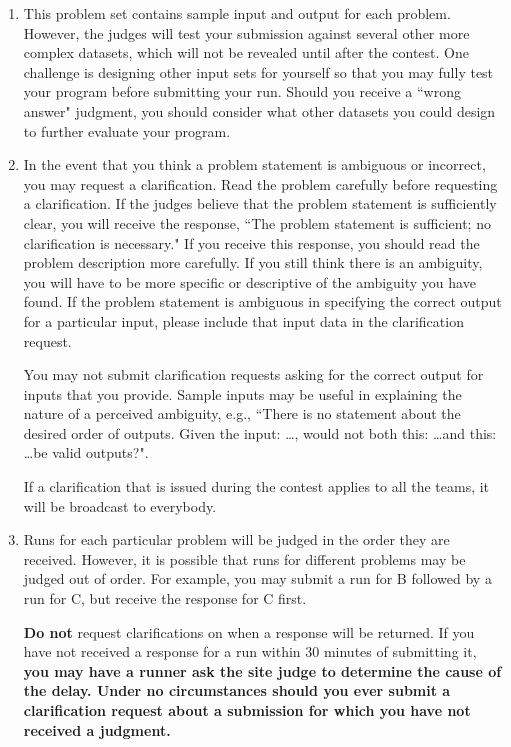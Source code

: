\begin{enumerate}
\item This problem set contains sample input and output for each
  problem. However, the judges will test your
  submission against several other more complex datasets, which will
  not be revealed until after the contest. One challenge is
  designing other input sets for yourself so that you may fully test
  your program before submitting your run. Should you receive a
  ``wrong answer" judgment, you should consider what other datasets you
  could design to further evaluate your program.

\item In the event that you think a problem statement is ambiguous or
  incorrect, you may request a clarification. Read the problem
  carefully before requesting a clarification. If the judges believe
  that the problem statement is sufficiently clear, you will receive
  the response, ``The problem statement is sufficient; no clarification
  is necessary." If you receive this response, you should read the
  problem description more carefully. If you still think there is an
  ambiguity, you will have to be more specific or descriptive of the
  ambiguity you have found. If the problem statement is ambiguous in
  specifying the correct output for a particular input, please include
  that input data in the clarification request.

You may not submit clarification requests asking for the correct
output for inputs that you provide. Sample inputs may be useful in
explaining the nature of a perceived ambiguity, e.g., ``There is no
statement about the desired order of outputs. Given the input: \ldots ,
would not both this: \ldots and this: \ldots be valid outputs?".

If a clarification that is issued during the contest applies to all
the teams, it will be broadcast to everybody.

\item Runs for each particular problem will be judged in the order
  they are received. However, it is possible that runs for different
  problems may be judged out of order. For example, you may submit a
  run for B followed by a run for C, but receive the response for C
  first.

{\bf Do not} request clarifications on when a response will be
returned. If you have not received a response for a run within 30
minutes of submitting it, {\bf you may have a runner ask the site
  judge to determine the cause of the delay. Under no circumstances
  should you ever submit a clarification request about a submission
  for which you have not received a judgment.}


\end{enumerate}
